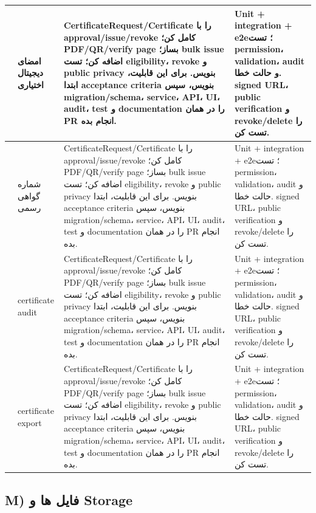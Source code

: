 \documentclass[11pt,a4paper]{article}
\begin{document}
\begin{longtable}{|>{\raggedleft\arraybackslash}p{}|>{\raggedleft\arraybackslash}p{}|>{\raggedleft\arraybackslash}p{}|>{\raggedleft\arraybackslash}p{}|}
217 & امضای دیجیتال اختیاری & CertificateRequest/Certificate را با approval/issue/revoke کامل کن؛ PDF/QR/verify page بساز؛ bulk issue اضافه کن؛ تست eligibility، revoke و public privacy بنویس. برای این قابلیت، ابتدا acceptance criteria بنویس، سپس migration/schema، service، API، UI، audit، test و documentation را در همان PR انجام بده. & Unit + integration + e2e؛ تست permission، validation، audit و حالت خطا. signed URL، public verification و revoke/delete را تست کن. \\ \hline
218 & شماره گواهی رسمی & CertificateRequest/Certificate را با approval/issue/revoke کامل کن؛ PDF/QR/verify page بساز؛ bulk issue اضافه کن؛ تست eligibility، revoke و public privacy بنویس. برای این قابلیت، ابتدا acceptance criteria بنویس، سپس migration/schema، service، API، UI، audit، test و documentation را در همان PR انجام بده. & Unit + integration + e2e؛ تست permission، validation، audit و حالت خطا. signed URL، public verification و revoke/delete را تست کن. \\ \hline
219 & certificate audit & CertificateRequest/Certificate را با approval/issue/revoke کامل کن؛ PDF/QR/verify page بساز؛ bulk issue اضافه کن؛ تست eligibility، revoke و public privacy بنویس. برای این قابلیت، ابتدا acceptance criteria بنویس، سپس migration/schema، service، API، UI، audit، test و documentation را در همان PR انجام بده. & Unit + integration + e2e؛ تست permission، validation، audit و حالت خطا. signed URL، public verification و revoke/delete را تست کن. \\ \hline
220 & certificate export & CertificateRequest/Certificate را با approval/issue/revoke کامل کن؛ PDF/QR/verify page بساز؛ bulk issue اضافه کن؛ تست eligibility، revoke و public privacy بنویس. برای این قابلیت، ابتدا acceptance criteria بنویس، سپس migration/schema، service، API، UI، audit، test و documentation را در همان PR انجام بده. & Unit + integration + e2e؛ تست permission، validation، audit و حالت خطا. signed URL، public verification و revoke/delete را تست کن. \\ \hline
\end{longtable}
\subsection{M) فایل ها و Storage}
\end{document}
